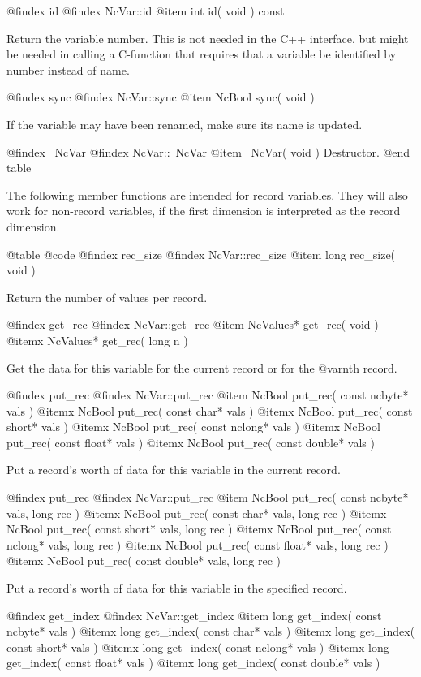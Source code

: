 @findex id
@findex NcVar::id
@item int id( void ) const

Return the variable number.  This is not needed in the C++ interface,
but might be needed in calling a C-function that requires that a variable
be identified by number instead of name.

@findex sync
@findex NcVar::sync
@item NcBool sync( void )

If the variable may have been renamed, make sure its name is updated.

@findex ~NcVar
@findex NcVar::~NcVar
@item ~NcVar( void )
Destructor.
@end table

The following member functions are intended for record variables.  They
will also work for non-record variables, if the first dimension is
interpreted as the record dimension.

@table @code
@findex rec_size
@findex NcVar::rec_size
@item long rec_size( void )

Return the number of values per record.

@findex get_rec
@findex NcVar::get_rec
@item NcValues* get_rec( void )
@itemx NcValues* get_rec( long n )

Get the data for this variable for the current record or for the
@var{n}th record.

@findex put_rec
@findex NcVar::put_rec
@item  NcBool put_rec( const ncbyte* vals )
@itemx NcBool put_rec( const char* vals )
@itemx NcBool put_rec( const short* vals )
@itemx NcBool put_rec( const nclong* vals )
@itemx NcBool put_rec( const float* vals )
@itemx NcBool put_rec( const double* vals )

Put a record's worth of data for this variable in the current record.

@findex put_rec
@findex NcVar::put_rec
@item  NcBool put_rec( const ncbyte* vals, long rec )
@itemx NcBool put_rec( const char* vals, long rec )
@itemx NcBool put_rec( const short* vals, long rec )
@itemx NcBool put_rec( const nclong* vals, long rec )
@itemx NcBool put_rec( const float* vals, long rec )
@itemx NcBool put_rec( const double* vals, long rec )

Put a record's worth of data for this variable in the specified record.

@findex get_index
@findex NcVar::get_index
@item  long get_index( const ncbyte* vals )
@itemx long get_index( const char* vals )
@itemx long get_index( const short* vals )
@itemx long get_index( const nclong* vals )
@itemx long get_index( const float* vals )
@itemx long get_index( const double* vals )

